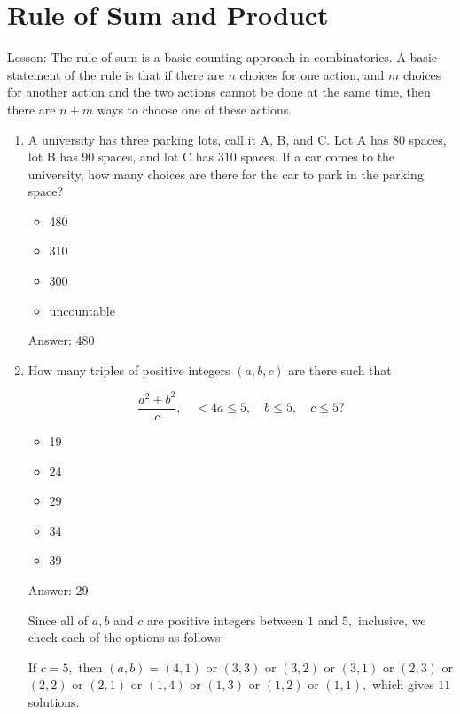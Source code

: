 \documentclass{article}
\begin{document}
\section{Rule of Sum and Product}

Lesson:
The rule of sum is a basic counting approach in combinatorics. A basic statement of the rule is that if there are \( n\) choices for one action, and \( m\) choices for another action and the two actions cannot be done at the same time, then there are \( n+m\) ways to choose one of these actions.

\begin{enumerate}
    \item A university has three parking lots, call it A, B, and C.  Lot A has 80 spaces, lot B has 90 spaces, and lot C has 310 spaces.  If a car comes to the university, how many choices are there for the car to park in the parking space?
    
    \begin{itemize}
        \item 480
        \item 310
        \item 300
        \item uncountable
    \end{itemize}
    
    Answer: 480
    
    \item How many triples of positive integers \( (a, b, c) \) are there such that
    
    \[\frac{a^2 + b^2}{c}, \quad <4a\le 5, \quad b\le 5, \quad c\le 5? \]
    
    \begin{itemize}
        \item 19
        \item 24
        \item 29
        \item 34
        \item 39
    \end{itemize}
    
    Answer: 29
    
    Since all of  \(a, b\) and  \(c\) are positive integers between  \(1\) and  \(5,\) inclusive, we check each of the options as follows:

If  \( c = 5, \) then  \((a, b)=(4,1)\) or  \((3,3)\) or  \((3,2)\) or  \((3,1)\) or  \((2,3)\) or  \((2,2)\) or  \((2, 1)\) or  \((1,4)\) or  \((1, 3)\) or  \((1, 2)\) or  \((1, 1),\) which gives  \(11\) solutions.


\end{enumerate}
\end{document}
